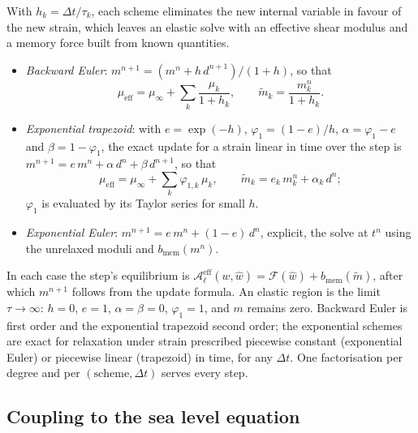 \documentclass[11pt,a4paper]{article}
\newcommand{\Ad}{\mathcal{A}_{\ell}}
\numberwithin{equation}{section}
\begin{document}
With $h_{k}=\Delta t/\tau_{k}$, each scheme eliminates the new internal variable
in favour of the new strain, which leaves an elastic solve with an effective
shear modulus and a memory force built from known quantities.
\begin{itemize}
\item[] \emph{Backward Euler}: $m^{n+1}=(m^{n}+h\,d^{n+1})/(1+h)$, so that
\begin{equation}
\mu_{\mathrm{eff}} = \mu_{\infty}+\sum_{k}\frac{\mu_{k}}{1+h_{k}},\qquad
\tilde m_{k} = \frac{m_{k}^{n}}{1+h_{k}}.
\end{equation}
\item[] \emph{Exponential trapezoid}: with $e=\exp(-h)$, $\varphi_{1}=(1-e)/h$,
$\alpha=\varphi_{1}-e$ and $\beta=1-\varphi_{1}$, the exact update for a strain
linear in time over the step is $m^{n+1}=e\,m^{n}+\alpha\,d^{n}+\beta\,d^{n+1}$,
so that
\begin{equation}
\mu_{\mathrm{eff}} = \mu_{\infty}+\sum_{k}\varphi_{1,k}\,\mu_{k},\qquad
\tilde m_{k} = e_{k}\,m_{k}^{n}+\alpha_{k}\,d^{n};
\end{equation}
$\varphi_{1}$ is evaluated by its Taylor series for small $h$.
\item[] \emph{Exponential Euler}: $m^{n+1}=e\,m^{n}+(1-e)\,d^{n}$, explicit, the
solve at $t^{n}$ using the unrelaxed moduli and $b_{\mathrm{mem}}(m^{n})$.
\end{itemize}
In each case the step's equilibrium is $\Ad^{\mathrm{eff}}(w,\hat w)=\mathcal{F}(\hat w)
+b_{\mathrm{mem}}(\tilde m)$, after which $m^{n+1}$ follows from the update
formula. An elastic region is the limit $\tau\to\infty$: $h=0$, $e=1$,
$\alpha=\beta=0$, $\varphi_{1}=1$, and $m$ remains zero. Backward Euler is first
order and the exponential trapezoid second order; the exponential schemes are
exact for relaxation under strain prescribed piecewise constant (exponential
Euler) or piecewise linear (trapezoid) in time, for any $\Delta t$. One
factorisation per degree and per $(\text{scheme},\Delta t)$ serves every step.

\subsection{Coupling to the sea level equation}
\end{document}
